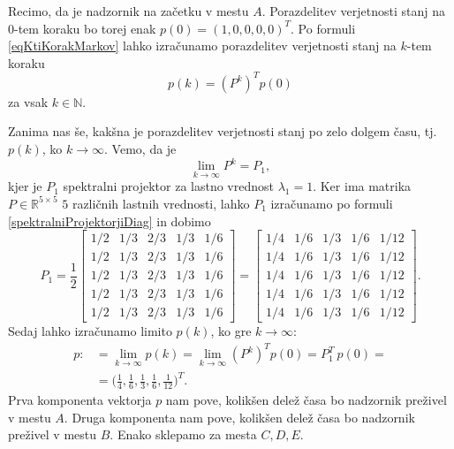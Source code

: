 \documentclass[mat1]{fmfdelo}
\newcommand{\R}{\mathbb R}
\newcommand{\N}{\mathbb N}
\begin{document}
Recimo, da je nadzornik na začetku v mestu $A$. Porazdelitev verjetnosti stanj na $0$-tem koraku bo torej enak $p(0) = (1, 0, 0, 0, 0)^T$. Po formuli \eqref{eqKtiKorakMarkov} lahko izračunamo porazdelitev verjetnosti stanj na $k$-tem koraku
\begin{equation*}
    p(k) = \left(P^k\right)^T p(0)
\end{equation*}
za vsak $k\in\N$.

Zanima nas še, kakšna je porazdelitev verjetnosti stanj po zelo dolgem času, tj. $p(k)$, ko $k\rightarrow\infty$. Vemo, da je
\begin{equation*}
    \lim_{k\rightarrow\infty} P^k = P_1,
\end{equation*}
kjer je $P_1$ spektralni projektor za lastno vrednost $\lambda_1 = 1$. Ker ima matrika $P \in \R^{5 \times 5}$ $5$ različnih lastnih vrednosti, lahko $P_1$ izračunamo po formuli \eqref{spektralniProjektorjiDiag} in dobimo
\begin{equation*}
    P_1 = \frac{1}{2}
    \begin{bmatrix}
        1/2 & 1/3 & 2/3 & 1/3 & 1/6 \\
        1/2 & 1/3 & 2/3 & 1/3 & 1/6 \\
        1/2 & 1/3 & 2/3 & 1/3 & 1/6 \\
        1/2 & 1/3 & 2/3 & 1/3 & 1/6 \\
        1/2 & 1/3 & 2/3 & 1/3 & 1/6
    \end{bmatrix}
    =
    \begin{bmatrix}
        1/4 & 1/6 & 1/3 & 1/6 & 1/12 \\
        1/4 & 1/6 & 1/3 & 1/6 & 1/12 \\
        1/4 & 1/6 & 1/3 & 1/6 & 1/12 \\
        1/4 & 1/6 & 1/3 & 1/6 & 1/12 \\
        1/4 & 1/6 & 1/3 & 1/6 & 1/12
    \end{bmatrix}.
\end{equation*}
Sedaj lahko izračunamo limito $p(k)$, ko gre $k\rightarrow\infty$:
\begin{align*}
    p :&=\lim_{k\rightarrow\infty} p(k) = \lim_{k\rightarrow\infty} \left(P^k\right)^T p(0) = P_1^T\  p(0) = \\
    &= \Big(\frac{1}{4}, \frac{1}{6}, \frac{1}{3}, \frac{1}{6}, \frac{1}{12}\Big)^T.
\end{align*}
Prva komponenta vektorja $p$ nam pove, kolikšen delež časa bo nadzornik preživel v mestu $A$. Druga komponenta nam pove, kolikšen delež časa bo nadzornik preživel v mestu $B$. Enako sklepamo za mesta $C, D, E$.
\end{document}
